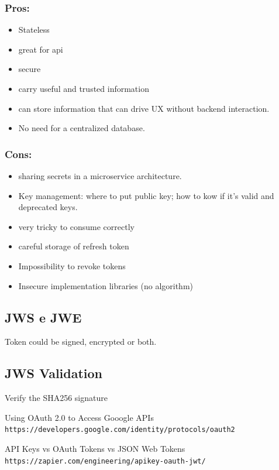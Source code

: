 \documentclass{style}
\begin{document}
\subsubsection{Pros:}
\begin{itemize}
    \item Stateless
    \item great for api
    \item secure
    \item carry useful and trusted information
    \item can store information that can drive UX without backend interaction.
    \item No need for a centralized database.
\end{itemize}
\subsubsection{Cons:}
\begin{itemize}
    \item sharing secrets in a microservice architecture.
    \item Key management: where to put public key; how to kow if it's valid and
        deprecated keys.
    \item very tricky to consume correctly
    \item careful storage of refresh token
    \item Impossibility to revoke tokens
    \item Insecure implementation libraries (no algorithm)
\end{itemize}

\subsection{JWS e JWE}
Token could be signed, encrypted or both.

\subsection{JWS Validation}
Verify the SHA256 signature

\begin{thebibliography}{9}
    Using OAuth 2.0 to Access Gooogle APIs
    \\
    \texttt{https://developers.google.com/identity/protocols/oauth2}

    API Keys vs OAuth Tokens vs JSON Web Tokens
    \\
    \texttt{https://zapier.com/engineering/apikey-oauth-jwt/}

\end{thebibliography}

\newpage
\end{document}
